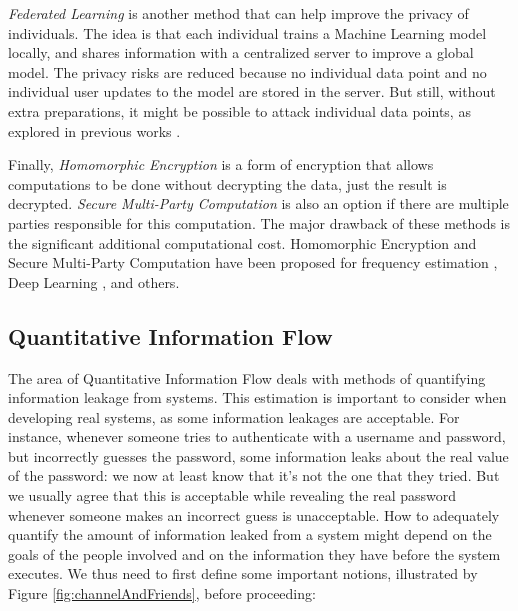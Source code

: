 \documentclass[conference]{IEEEtran}
\begin{document}
\emph{Federated Learning} is another method that can help improve the privacy of individuals. The idea is that each individual trains a Machine Learning model locally, and shares information with a centralized server to improve a global model. The privacy risks are reduced because no individual data point and no individual user updates to the model are stored in the server. But still, without extra preparations, it might be possible to attack individual data points, as explored in previous works \cite{wang2019beyond}.

Finally, \emph{Homomorphic Encryption} is a form of encryption that allows computations to be done without decrypting the data, just the result is decrypted. \emph{Secure Multi-Party Computation} is also an option if there are multiple parties responsible for this computation. The major drawback of these methods is the significant additional computational cost. Homomorphic Encryption and Secure Multi-Party Computation have been proposed for frequency estimation \cite{yang2005privacy}, Deep Learning \cite{hesamifard2017cryptodl}\cite{goswami2024privacy}, and others.


\subsection{Quantitative Information Flow}

The area of Quantitative Information Flow deals with methods of quantifying information leakage from systems. This estimation is important to consider when developing real systems, as some information leakages are acceptable. For instance, whenever someone tries to authenticate with a username and password, but incorrectly guesses the password, some information leaks about the real value of the password: we now at least know that it's not the one that they tried. But we usually agree that this is acceptable while revealing the real password whenever someone makes an incorrect guess is unacceptable. How to adequately quantify the amount of information leaked from a system might depend on the goals of the people involved and on the information they have before the system executes. We thus need to first define some important notions, illustrated by Figure \ref{fig:channelAndFriends}, before proceeding:
\end{document}
